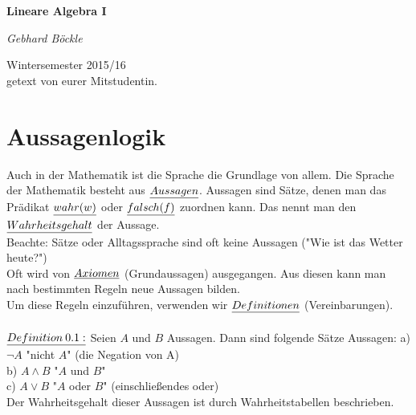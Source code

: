 \documentclass[fleqn, a4paper, 11pt]{article}
\begin{document}
\begin{titlepage}
	\centering
	\huge\bfseries Lineare Algebra I \par
	\vspace{3cm}
	\Large\itshape Gebhard B\"ockle \par
	\vspace{8cm}
	Wintersemester 2015/16\\
	getext von eurer Mitstudentin.
\end{titlepage}
\newpage
\tableofcontents
\newpage

\setcounter{section}{-1}
\section{Aussagenlogik}

Auch in der Mathematik ist die Sprache die Grundlage von allem. Die Sprache der Mathematik besteht aus $\uline{Aussagen}$. Aussagen sind S\"atze, denen man das Pr\"adikat $\uline{wahr(w)}$ oder $\uline{falsch(f)}$ zuordnen kann. Das nennt man den $\uline{Wahrheitsgehalt}$ der Aussage.\\
Beachte: S\"atze oder Alltagssprache sind oft keine Aussagen ("Wie ist das Wetter heute?") \\
Oft wird von $\uline{Axiomen}$ (Grundaussagen) ausgegangen. Aus diesen kann man nach bestimmten Regeln neue Aussagen bilden.\\
Um diese Regeln einzuf\"uhren, verwenden wir $\uline{Definitionen}$ (Vereinbarungen).\\
\\
$\uline{Definition\:0.1:}$ Seien $A$ und $B$ Aussagen. Dann sind folgende S\"atze Aussagen:
a) $\neg A$  "nicht $A$" (die Negation von A)\\
b) $A\wedge B$  "$A$ und $B$"\\
c) $A\vee B$  "$A$ oder $B$" (einschlie\ss{}endes oder)\\
Der Wahrheitsgehalt dieser Aussagen ist durch Wahrheitstabellen beschrieben.\\
\end{document}
